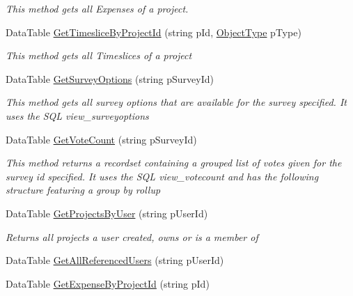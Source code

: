 \begin{DoxyCompactItemize}
\begin{DoxyCompactList}\small\item\em This method gets all Expenses of a project. \end{DoxyCompactList}\item 
Data\+Table \hyperlink{class_plex_byte_1_1_mo_cap_1_1_backend_1_1_backend_service_a0ff59c331b4b94659b875602a54ece65}{Get\+Timeslice\+By\+Project\+Id} (string p\+Id, \hyperlink{namespace_plex_byte_1_1_mo_cap_1_1_backend_acbe18958b9ae9c08f5c2d2c580fbbf2a}{Object\+Type} p\+Type)
\begin{DoxyCompactList}\small\item\em This method gets all Timeslices of a project \end{DoxyCompactList}\item 
Data\+Table \hyperlink{class_plex_byte_1_1_mo_cap_1_1_backend_1_1_backend_service_a35fe823ccc300f00bd72f99313609835}{Get\+Survey\+Options} (string p\+Survey\+Id)
\begin{DoxyCompactList}\small\item\em This method gets all survey options that are available for the survey specified. It uses the S\+QL view\+\_\+surveyoptions \end{DoxyCompactList}\item 
Data\+Table \hyperlink{class_plex_byte_1_1_mo_cap_1_1_backend_1_1_backend_service_a709aa17c80b19ca328d99eb468b9054b}{Get\+Vote\+Count} (string p\+Survey\+Id)
\begin{DoxyCompactList}\small\item\em This method returns a recordset containing a grouped list of votes given for the survey id specified. It uses the S\+QL view\+\_\+votecount and has the following structure featuring a group by rollup \end{DoxyCompactList}\item 
Data\+Table \hyperlink{class_plex_byte_1_1_mo_cap_1_1_backend_1_1_backend_service_a922269b8f99a4c0c92d4d7df51f7024b}{Get\+Projects\+By\+User} (string p\+User\+Id)
\begin{DoxyCompactList}\small\item\em Returns all projects a user created, owns or is a member of \end{DoxyCompactList}\item 
Data\+Table \hyperlink{class_plex_byte_1_1_mo_cap_1_1_backend_1_1_backend_service_ab33310787b59934d0282f6f2d11d239c}{Get\+All\+Referenced\+Users} (string p\+User\+Id)
\item 
Data\+Table \hyperlink{class_plex_byte_1_1_mo_cap_1_1_backend_1_1_backend_service_a2f3b313c5d86880ca913320041b47d6a}{Get\+Expense\+By\+Project\+Id} (string p\+Id)

\end{DoxyCompactItemize}
